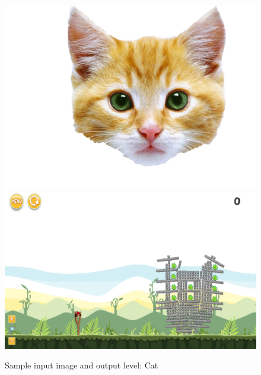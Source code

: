 \documentclass{dalthesis}
\begin{document}
\begin{figure}
	\caption{Sample input image and output level: Cat}
  \includegraphics[width=\textwidth,height=\textheight,keepaspectratio]{levels/pictures/animals/cat.jpg}
  \includegraphics[width=\textwidth,height=\textheight,keepaspectratio]{levels/screenshots/animals/cat.png}
\end{figure}
\end{document}
